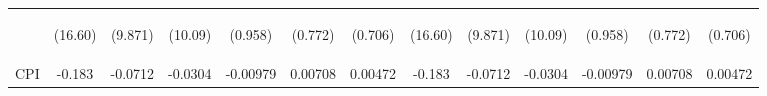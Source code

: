 \documentclass[]{article}
\begin{document}
\begin{center}
\begin{tabular}{lcccccccccccc}
\vspace{4pt} & \begin{footnotesize}(16.60)\end{footnotesize} & \begin{footnotesize}(9.871)\end{footnotesize} & \begin{footnotesize}(10.09)\end{footnotesize} & \begin{footnotesize}(0.958)\end{footnotesize} & \begin{footnotesize}(0.772)\end{footnotesize} & \begin{footnotesize}(0.706)\end{footnotesize} & \begin{footnotesize}(16.60)\end{footnotesize} & \begin{footnotesize}(9.871)\end{footnotesize} & \begin{footnotesize}(10.09)\end{footnotesize} & \begin{footnotesize}(0.958)\end{footnotesize} & \begin{footnotesize}(0.772)\end{footnotesize} & \begin{footnotesize}(0.706)\end{footnotesize} \\
CPI & -0.183 & -0.0712 & -0.0304 & -0.00979 & 0.00708 & 0.00472 & -0.183 & -0.0712 & -0.0304 & -0.00979 & 0.00708 & 0.00472 \\

\end{tabular}
\end{center}
\end{document}
